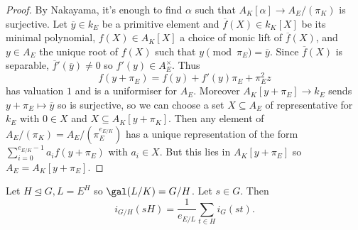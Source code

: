 \documentclass[a4paper]{article}
\begin{document}
\begin{proof}
  By Nakayama, it's enough to find \(\alpha\) such that \(A_K[\alpha] \to A_E/(\pi_K)\) is surjective. Let \(\overline y \in k_E\) be a primitive element and \(\overline f(X) \in k_K[X]\) be its minimal polynomial, \(f(X) \in A_K[X]\) a choice of monic lift of \(\overline f(X)\), and \(y \in A_E\) the unique root of \(f(X)\) such that \(y \pmod{\pi_E} = \overline y\). Since \(\overline f(X)\) is separable, \(\overline f'(\overline y) \neq 0\) so \(f'(y) \in A_E^\times\). Thus
  \[
    f(y + \pi_E) = f(y) + f'(y) \pi_E + \pi_E^2 z
  \]
  has valuation \(1\) and is a uniformiser for \(A_E\). Moreover \(A_K[y + \pi_E] \to k_E\) sends \(y + \pi_E \mapsto \overline y\) so is surjective, so we can choose a set \(X \subseteq A_E\) of representative for \(k_E\) with \(0 \in X\) and \(X \subseteq A_K[y + \pi_K]\). Then any element of \(A_E/(\pi_K) = A_E/(\pi_E^{e_{E/K}})\) has a unique representation of the form \(\sum_{i = 0}^{e_{E/K} - 1} a_i f(y + \pi_E)\) with \(a_i \in X\). But this lies in \(A_K[y + \pi_E]\) so \(A_E = A_K[y + \pi_E]\).
\end{proof}

\begin{lemma}
  Let \(H \trianglelefteq G, L = E^H\) so \(\gal(L/K) = G/H\). Let \(s \in G\). Then
  \[
    i_{G/H}(sH) = \frac{1}{e_{E/L}} \sum_{t \in H} i_G(st).
  \]
\end{lemma}
\end{document}
